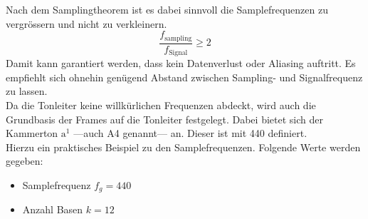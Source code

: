 Nach dem Samplingtheorem ist es dabei sinnvoll die Samplefrequenzen zu vergrössern und nicht zu verkleinern.
\[ \frac{f_{\text{sampling}}}{f_{\text{Signal}}} \geq 2\]
Damit kann garantiert werden, dass kein Datenverlust oder Aliasing auftritt. Es empfiehlt sich ohnehin genügend Abstand zwischen Sampling- und Signalfrequenz zu lassen.\\

Da die Tonleiter keine willkürlichen Frequenzen abdeckt, wird auch die Grundbasis der Frames auf die Tonleiter festgelegt. Dabei bietet sich der Kammerton $\text{a}^{1}$ ---auch A4 genannt--- an. Dieser ist mit 440 \text{[Hz]} definiert.\\




Hierzu ein praktisches Beispiel zu den Samplefrequenzen. Folgende Werte werden gegeben:
\begin{itemize}
	\item Samplefrequenz $f_{g}=440$\text{[Hz]}
	\item Anzahl Basen $k=12$
\end{itemize}	

